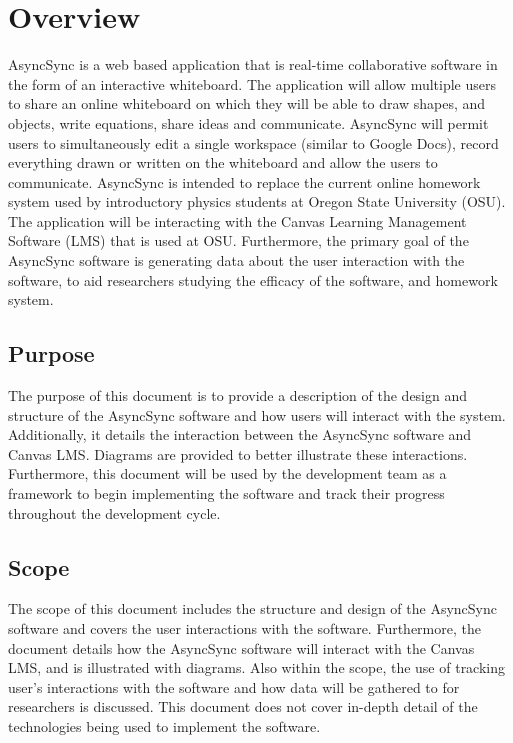 \documentclass[onecolumn, draftclsnofoot,10pt, compsoc]{IEEEtran}
\begin{document}
\section{Overview}

	AsyncSync is a web based application that is real-time collaborative software in the form of an interactive whiteboard. The application will allow multiple users to share an online whiteboard on which they will be able to draw shapes, and objects, write equations, share ideas and communicate. AsyncSync will permit users to simultaneously edit a single workspace (similar to Google Docs), record everything drawn or written on the whiteboard and allow the users to communicate. AsyncSync is intended to replace the current online homework system used by introductory physics students at Oregon State University (OSU). The application will be interacting with the Canvas Learning Management Software (LMS) that is used at OSU. Furthermore, the primary goal of the AsyncSync software is generating data about the user interaction with the software, to aid researchers studying the efficacy of the software, and homework system.

\subsection{Purpose}

	The purpose of this document is to provide a description of the design and structure of the AsyncSync software and how users will interact with the system. Additionally, it details the interaction between the AsyncSync software and Canvas LMS. Diagrams are provided to better illustrate these interactions. Furthermore, this document will be used by the development team as a framework to begin implementing the software and track their progress throughout the development cycle.

	\subsection{Scope}

	The scope of this document includes the structure and design of the AsyncSync software and covers the user interactions with the software. Furthermore, the document details how the AsyncSync software will interact with the Canvas LMS, and is illustrated with diagrams. Also within the scope, the use of tracking user’s interactions with the software and how data will be gathered to for researchers is discussed. This document does not cover in-depth detail of the technologies being used to implement the software.
\end{document}
